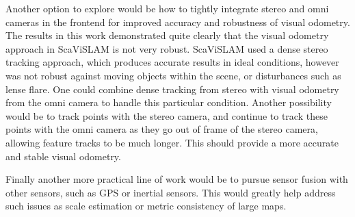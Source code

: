 Another option to explore would be how to tightly integrate stereo and omni cameras in the frontend for improved accuracy and robustness of visual odometry.  The results in this work demonstrated quite clearly that the visual odometry approach in ScaViSLAM is not very robust.  ScaViSLAM used a dense stereo tracking approach, which produces accurate results in ideal conditions, however was not robust against moving objects within the scene, or disturbances such as lense flare.  One could combine dense tracking from stereo with visual odometry from the omni camera to handle this particular condition.  Another possibility would be to track points with the stereo camera, and continue to track these points with the omni camera as they go out of frame of the stereo camera, allowing feature tracks to be much longer.  This should provide a more accurate and stable visual odometry.

Finally another more practical line of work would be to pursue sensor fusion with other sensors, such as GPS or inertial sensors.  This would greatly help address such issues as scale estimation or metric consistency of large maps.


